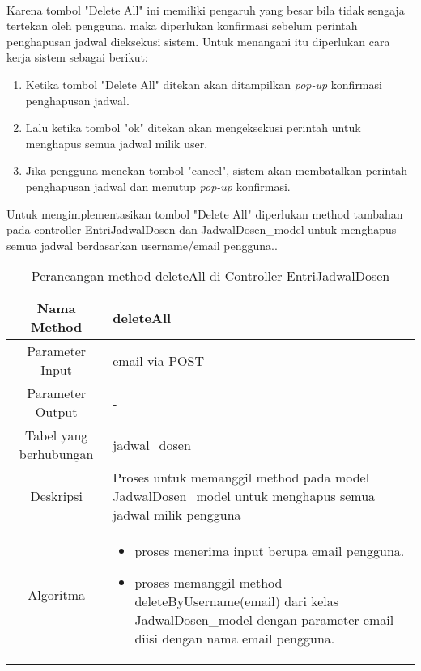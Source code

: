 \paragraph{}Karena tombol "Delete All" ini memiliki pengaruh yang besar bila tidak sengaja tertekan oleh pengguna, maka diperlukan konfirmasi sebelum perintah penghapusan jadwal dieksekusi sistem.\newline
Untuk menangani itu diperlukan cara kerja sistem sebagai berikut:
\begin{enumerate}
	\item Ketika tombol "Delete All" ditekan akan ditampilkan \textit{pop-up} konfirmasi penghapusan jadwal.
	\item Lalu ketika tombol "ok" ditekan akan mengeksekusi perintah untuk menghapus semua jadwal milik user.
	\item Jika pengguna menekan tombol "cancel", sistem akan membatalkan perintah penghapusan jadwal dan menutup \textit{pop-up} konfirmasi.
\end{enumerate}
Untuk mengimplementasikan tombol "Delete All" diperlukan method tambahan pada controller EntriJadwalDosen dan JadwalDosen\_model untuk menghapus semua jadwal berdasarkan username/email pengguna..
\begin{center}
\begin{table}[H]
\caption{Perancangan method deleteAll di Controller EntriJadwalDosen}
\begin{tabular}{|c|p{11cm}|}
\hline
Nama Method 	& 	deleteAll 	\\
\hline
Parameter Input & email via POST \\
\hline
Parameter Output & - \\
\hline
Tabel yang berhubungan & jadwal\_dosen \\
\hline
Deskripsi	& Proses untuk memanggil method pada model JadwalDosen\_model untuk menghapus semua jadwal milik pengguna \\
\hline
Algoritma	& \begin{itemize}
				\item proses menerima input berupa email pengguna.
				\item proses memanggil method deleteByUsername(email) dari kelas JadwalDosen\_model dengan parameter email diisi dengan nama email pengguna.
				\end{itemize} \\
\hline
\end{tabular}
\end{table}
\end{center}

